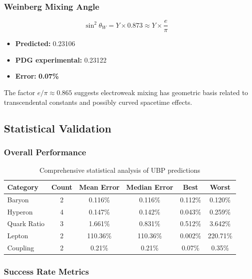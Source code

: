 \documentclass[11pt,twocolumn]{article}
\begin{document}
\subsubsection{Weinberg Mixing Angle}

\begin{equation}
\sin^2\theta_W = Y \times 0.873 \approx Y \times \frac{e}{\pi}
\end{equation}

\begin{itemize}
\item \textbf{Predicted:} 0.23106
\item \textbf{PDG experimental:} 0.23122
\item \textbf{Error:} \textbf{0.07\%}
\end{itemize}

The factor $e/\pi \approx 0.865$ suggests electroweak mixing has geometric basis related to transcendental constants and possibly curved spacetime effects.

\subsection{Statistical Validation}

\subsubsection{Overall Performance}

\begin{table}[H]
\centering
\caption{Comprehensive statistical analysis of UBP predictions}
\begin{tabular}{lccccc}
\toprule
\textbf{Category} & \textbf{Count} & \textbf{Mean Error} & \textbf{Median Error} & \textbf{Best} & \textbf{Worst} \\
\midrule
Baryon & 2 & 0.116\% & 0.116\% & 0.112\% & 0.120\% \\
Hyperon & 4 & 0.147\% & 0.142\% & 0.043\% & 0.259\% \\
Quark Ratio & 3 & 1.661\% & 0.831\% & 0.512\% & 3.642\% \\
Lepton & 2 & 110.36\% & 110.36\% & 0.002\% & 220.71\% \\
Coupling & 2 & 0.21\% & 0.21\% & 0.07\% & 0.35\% \\
\bottomrule
\end{tabular}
\end{table}

\subsubsection{Success Rate Metrics}
\end{document}
